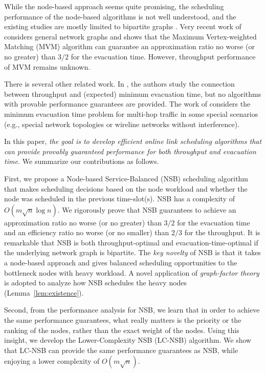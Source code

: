\documentclass[10pt,journal,compsoc]{IEEEtran}
\begin{document}
While the node-based approach seems quite promising, the scheduling performance of the node-based algorithms 
is not well understood, and the existing studies are mostly limited to bipartite graphs \cite{mekkittikul98,tabatabaee09,guptathesis}. 
Very recent work of \cite{ji15ciss} considers general network graphs and shows that the Maximum Vertex-weighted 
Matching (MVM) algorithm can guarantee an approximation ratio no worse (or no greater) than $3/2$ for the evacuation 
time. However, throughput performance of MVM remains unknown. 

There is several other related work. In \cite{georgiadis15}, the authors study the connection between 
throughput and (expected) minimum evacuation time, but no algorithms with provable performance 
guarantees are provided. The work of \cite{tassiulas95,tassiulas99,soldati09} considers the minimum 
evacuation time problem for multi-hop traffic in some special scenarios (e.g., special network topologies 
or wireline networks without interference).

In this paper, \emph{the goal is to develop efficient online link scheduling algorithms that can provide 
provably guaranteed performance for both throughput and evacuation time.} We summarize our 
contributions as follows.

First, we propose a Node-based Service-Balanced (NSB) scheduling algorithm that makes scheduling 
decisions based on the node workload and whether the node was scheduled in the previous time-slot(s). 
NSB has a complexity of $O(m \sqrt{n} \log{n})$.
We rigorously prove that NSB guarantees to achieve an approximation ratio no worse (or no greater) 
than $3/2$ for the evacuation time and an efficiency ratio no worse (or no smaller) than $2/3$ for the 
throughput. It is remarkable that NSB is both throughput-optimal and evacuation-time-optimal if the underlying 
network graph is bipartite. The \emph{key novelty} of NSB is that it takes a node-based approach and 
gives balanced scheduling opportunities to the bottleneck nodes with heavy workload. A novel application 
of \emph{graph-factor theory} is adopted to analyze how NSB schedules the heavy nodes (Lemma~\ref{lem:existence}).

Second, from the performance analysis for NSB, we learn that in order to achieve the same performance guarantees, 
what really matters is the priority or the ranking of the nodes, rather than the exact weight of the nodes. 
Using this insight, we develop the Lower-Complexity NSB (LC-NSB) algorithm. We show that LC-NSB 
can provide the same performance guarantees as NSB, while enjoying a lower complexity of $O(m \sqrt{n})$.
\end{document}
